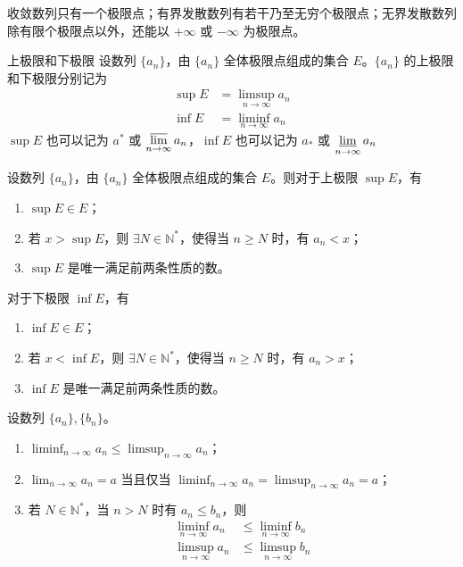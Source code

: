 \begin{remark}
    收敛数列只有一个极限点；有界发散数列有若干乃至无穷个极限点；无界发散数列除有限个极限点以外，还能以 $+\infty$ 或 $-\infty$ 为极限点。
\end{remark}

\begin{definition}{上极限和下极限}
    设数列 $\{a_n\}$，由 $\{a_n\}$ 全体极限点组成的集合 $E$。$\{a_n\}$ 的上极限和下极限分别记为
    \begin{align*}
        \sup E & = \limsup_{n \to \infty} a_n \\
        \inf E & = \liminf_{n \to \infty} a_n
    \end{align*}
    $\sup E$ 也可以记为 $a^{*}$ 或 $\displaystyle \varlimsup_{n \to \infty} a_n$，$\inf E$ 也可以记为 $a_{*}$ 或 $\displaystyle \varliminf_{n \to \infty} a_n$
\end{definition}

\begin{theorem}
    设数列 $\{a_n\}$，由 $\{a_n\}$ 全体极限点组成的集合 $E$。则对于上极限 $\sup E$，有
    \begin{enumerate}
        \item $\sup E \in E$；
        \item 若 $x > \sup E$，则 $\exists N \in \mathbb{N}^{*}$，使得当 $n \geqslant N$ 时，有 $a_n < x$；
        \item $\sup E$ 是唯一满足前两条性质的数。
    \end{enumerate}
    对于下极限 $\inf E$，有
    \begin{enumerate}
        \item $\inf E \in E$；
        \item 若 $x < \inf E$，则 $\exists N \in \mathbb{N}^{*}$，使得当 $n \geqslant N$ 时，有 $a_n > x$；
        \item $\inf E$ 是唯一满足前两条性质的数。
    \end{enumerate}
\end{theorem}

\begin{theorem}
  设数列 $\{a_n\}, \{b_n\}$。
  \begin{enumerate}
    \item $\displaystyle \liminf_{n \to \infty} a_n \leqslant \limsup_{n \to \infty} a_n$；
    \item $\displaystyle \lim_{n \to \infty} a_n = a$ 当且仅当 $\displaystyle \liminf_{n \to \infty} a_n = \limsup_{n \to \infty} a_n = a$；
    \item 若 $N \in \mathbb{N}^{*}$，当 $n > N$ 时有 $a_n \leqslant b_n$，则
    \begin{align*}
        \liminf_{n \to \infty} a_n & \leqslant \liminf_{n \to \infty} b_n \\
        \limsup_{n \to \infty} a_n & \leqslant \limsup_{n \to \infty} b_n
    \end{align*}
  \end{enumerate}
\end{theorem}

